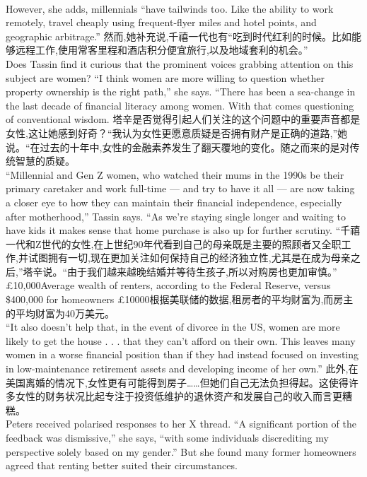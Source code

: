 \documentclass[a4paper,12pt]{article}
\begin{document}
\\However, she adds, millennials “have tailwinds too. Like the ability to work remotely, travel cheaply using frequent-flyer miles and hotel points, and geographic arbitrage.”
然而,她补充说,千禧一代也有“吃到时代红利的时候。比如能够远程工作,使用常客里程和酒店积分便宜旅行,以及地域套利的机会。”
\\Does Tassin find it curious that the prominent voices grabbing attention on this subject are women? “I think women are more willing to question whether property ownership is the right path,” she says. “There has been a sea-change in the last decade of financial literacy among women. With that comes questioning of conventional wisdom.
塔辛是否觉得引起人们关注的这个问题中的重要声音都是女性,这让她感到好奇？“我认为女性更愿意质疑是否拥有财产是正确的道路,”她说。“在过去的十年中,女性的金融素养发生了翻天覆地的变化。随之而来的是对传统智慧的质疑。
\\“Millennial and Gen Z women, who watched their mums in the 1990s be their primary caretaker and work full-time — and try to have it all — are now taking a closer eye to how they can maintain their financial independence, especially after motherhood,” Tassin says. “As we're staying single longer and waiting to have kids it makes sense that home purchase is also up for further scrutiny.
“千禧一代和Z世代的女性,在上世纪90年代看到自己的母亲既是主要的照顾者又全职工作,并试图拥有一切,现在更加关注如何保持自己的经济独立性,尤其是在成为母亲之后,”塔辛说。“由于我们越来越晚结婚并等待生孩子,所以对购房也更加审慎。”
\\£10,000Average wealth of renters, according to the Federal Reserve, versus \$400,000 for homeowners
£10000根据美联储的数据,租房者的平均财富为,而房主的平均财富为40万美元。
\\“It also doesn't help that, in the event of divorce in the US, women are more likely to get the house . . . that they can't afford on their own. This leaves many women in a worse financial position than if they had instead focused on investing in low-maintenance retirement assets and developing income of her own.”
此外,在美国离婚的情况下,女性更有可能得到房子……但她们自己无法负担得起。这使得许多女性的财务状况比起专注于投资低维护的退休资产和发展自己的收入而言更糟糕。
\\Peters received polarised responses to her X thread. “A significant portion of the feedback was dismissive,” she says, “with some individuals discrediting my perspective solely based on my gender.” But she found many former homeowners agreed that renting better suited their circumstances.
\end{document}
